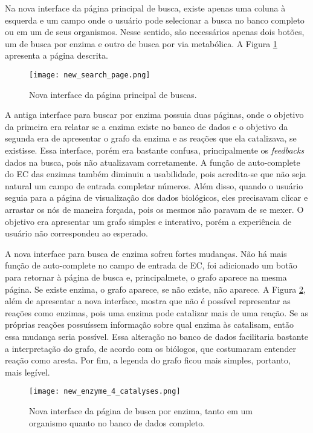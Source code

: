 \indent Na nova interface da página principal de busca, existe apenas uma coluna à esquerda e um campo onde o usuário pode selecionar a busca no banco completo ou em um de seus organismos. Nesse sentido, são necessários apenas dois botões, um de busca por enzima e outro de busca por via metabólica. A Figura \ref{fig:new_search_page} apresenta a página descrita.

\begin{figure}[!h]
    \centering
    \texttt{[image: new\_search\_page.png]}
    \caption{Nova interface da página principal de buscas.}
    \label{fig:new_search_page}
\end{figure}

\indent A antiga interface para buscar por enzima possuia duas páginas, onde o objetivo da primeira era relatar se a enzima existe no banco de dados e o objetivo da segunda era de apresentar o grafo da enzima e as reações que ela catalizava, se existisse. Essa interface, porém era bastante confusa, principalmente os \textit{feedbacks} dados na busca, pois não atualizavam corretamente. A função de auto-complete do EC das enzimas também diminuiu a usabilidade, pois acredita-se que não seja natural um campo de entrada completar números. Além disso, quando o usuário seguia para a página de visualização dos dados biológicos, eles precisavam clicar e arrastar os nós de maneira forçada, pois os mesmos não paravam de se mexer. O objetivo era apresentar um grafo simples e interativo, porém a experiência de usuário não correspondeu ao esperado.

\indent A nova interface para busca de enzima sofreu fortes mudanças. Não há mais função de auto-complete no campo de entrada de EC, foi adicionado um botão para retornar à página de busca e, principalmete, o grafo aparece na mesma página. Se existe enzima, o grafo aparece, se não existe, não aparece. A Figura \ref{fig:new_enzyme_4_catalyses}, além de apresentar a nova interface, mostra que não é possível representar as reações como enzimas, pois uma enzima pode catalizar mais de uma reação. Se as próprias reações possuíssem informação sobre qual enzima às catalisam, então essa mudança seria possível. Essa alteração no banco de dados facilitaria bastante a interpretação do grafo, de acordo com os biólogos, que costumaram entender reação como aresta. Por fim, a legenda do grafo ficou mais simples, portanto, mais legível.

\begin{figure}[!h]
	\centering
	\texttt{[image: new\_enzyme\_4\_catalyses.png]}
	\caption{Nova interface da página de busca por enzima, tanto em um organismo quanto no banco de dados completo.}
	\label{fig:new_enzyme_4_catalyses}
\end{figure}

